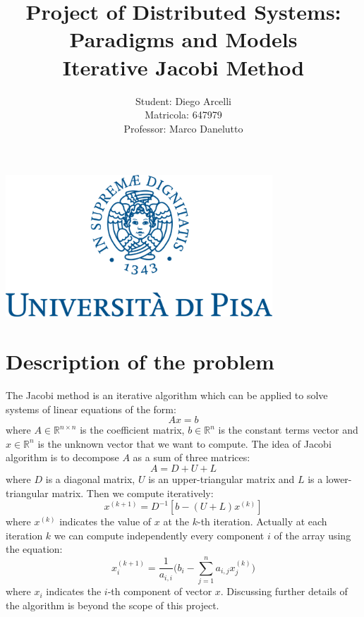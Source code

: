 \documentclass[12pt]{article}
\begin{document}
	
	\begin{titlepage}
		
		\title{Project of Distributed Systems: Paradigms and Models \\
		Iterative Jacobi Method}
		\author{Student: Diego Arcelli\\ Matricola: 647979 \\
			Professor: Marco  Danelutto}
		\maketitle
		\centering
		\includegraphics[width=10cm]{./images/unipi_logo.png}
		
	\end{titlepage}
	
	\tableofcontents
	\newpage
	
	\section{Description of the problem}
	The Jacobi method is an iterative algorithm which can be applied to solve systems of linear equations of the form:
	\[ Ax = b\]
	where $A \in \mathbb{R}^{n\times n}$ is the coefficient matrix, $b \in \mathbb{R}^n$ is the constant terms vector and $x\in \mathbb{R}^n$ is the unknown vector that we want to compute. The idea of Jacobi algorithm is to decompose $A$ as a sum of three matrices:
	\[ A = D + U + L\]
	where $D$ is a diagonal matrix, $U$ is an upper-triangular matrix and $L$ is a lower-triangular matrix. Then we compute iteratively:
	\[ x^{(k+1)} =  D^{-1}[b-(U+L)x^{(k)}] \]
	where $x^{(k)}$ indicates the value of $x$ at the $k$-th iteration. Actually at each iteration $k$ we can compute independently every component $i$ of the array using the equation:
	\begin{equation}
		\label{eqn:iteration}
		x^{(k+1)}_i = \frac{1}{a_{i,i}}\Big(b_i - \sum_{j=1}^n a_{i,j}x^{(k)}_j\Big)
	\end{equation}
	where $x_i$ indicates the $i$-th component of vector $x$. Discussing further details of the algorithm is beyond the scope of this project. 
	
\end{document}

